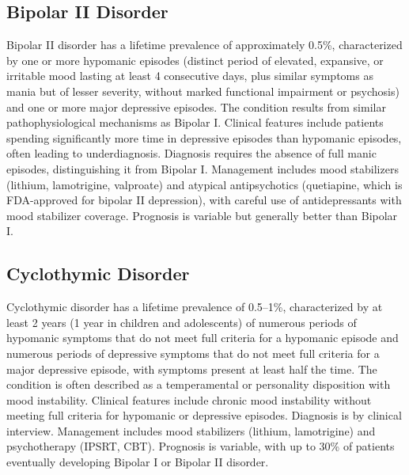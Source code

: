 \subsection{Bipolar II Disorder}
\label{sec:Bipolar II Disorder}
Bipolar II disorder has a lifetime prevalence of approximately 0.5\%, characterized by one or more hypomanic episodes (distinct period of elevated, expansive, or irritable mood lasting at least 4 consecutive days, plus similar symptoms as mania but of lesser severity, without marked functional impairment or psychosis) and one or more major depressive episodes. The condition results from similar pathophysiological mechanisms as Bipolar I. Clinical features include patients spending significantly more time in depressive episodes than hypomanic episodes, often leading to underdiagnosis. Diagnosis requires the absence of full manic episodes, distinguishing it from Bipolar I. Management includes mood stabilizers (lithium, lamotrigine, valproate) and atypical antipsychotics (quetiapine, which is FDA-approved for bipolar II depression), with careful use of antidepressants with mood stabilizer coverage. Prognosis is variable but generally better than Bipolar I.

\subsection{Cyclothymic Disorder}
\label{sec:Cyclothymic Disorder}
Cyclothymic disorder has a lifetime prevalence of 0.5--1\%, characterized by at least 2 years (1 year in children and adolescents) of numerous periods of hypomanic symptoms that do not meet full criteria for a hypomanic episode and numerous periods of depressive symptoms that do not meet full criteria for a major depressive episode, with symptoms present at least half the time. The condition is often described as a temperamental or personality disposition with mood instability. Clinical features include chronic mood instability without meeting full criteria for hypomanic or depressive episodes. Diagnosis is by clinical interview. Management includes mood stabilizers (lithium, lamotrigine) and psychotherapy (IPSRT, CBT). Prognosis is variable, with up to 30\% of patients eventually developing Bipolar I or Bipolar II disorder.

